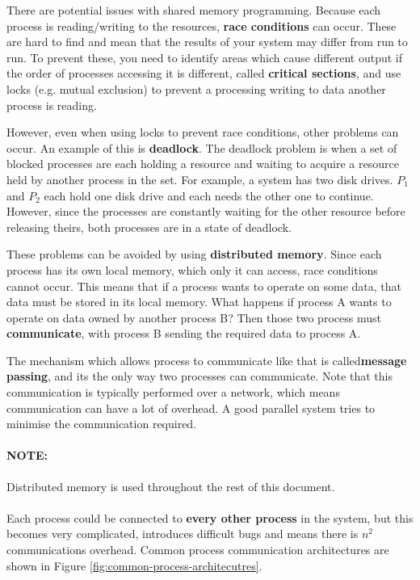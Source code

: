 \documentclass{article}
\begin{document}
There are potential issues with shared memory programming. Because each process is reading/writing to the resources, \textbf{race conditions} can occur. These are hard to find and mean that the results of your system may differ from run to run. To prevent these, you need to identify areas which cause different output if the order of processes accessing it is different, called \textbf{critical sections}, and use locks (e.g. mutual exclusion) to prevent a processing writing to data another process is reading.

However, even when using locks to prevent race conditions, other problems can occur. An example of this is \textbf{deadlock}. The deadlock problem is when a set of blocked processes are each holding a resource and waiting to acquire a resource held by another process in the set. For example, a system has two disk drives. $P_1$ and $P_2$ each hold one disk drive and each needs the other one to continue. However, since the processes are constantly waiting for the other resource before releasing theirs, both processes are in a state of deadlock.

These problems can be avoided by using \textbf{distributed memory}. Since each process has its own local memory, which only it can access, race conditions cannot occur. This means that if a process wants to operate on some data, that data must be stored in its local memory. What happens if process A wants to operate on data owned by another process B? Then those two process must \textbf{communicate}, with process B sending the required data to process A. 

The mechanism which allows process to communicate like that is called\textbf{message passing}, and its the only way two processes can communicate. Note that this communication is typically performed over a network, which means communication can have a lot of overhead.  A good parallel system tries to minimise the communication required.

\paragraph{\textbf{NOTE:}} Distributed memory is used throughout the rest of this document.

\paragraph{}

Each process could be connected to \textbf{every other process} in the system, but this becomes very complicated, introduces difficult bugs and means there is $n^2$ communications overhead. Common process communication architectures are shown in Figure \ref{fig:common-process-architecutres}.
\end{document}
